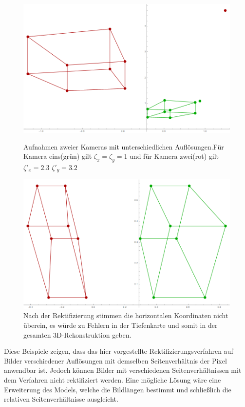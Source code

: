 \begin{figure}[!htb]
	\includegraphics[width=\linewidth]{images/Rectification_Resolution_Abbild_verhaeltnisse.png}
	\caption[Rektifizierung mit $\zeta'_x = 2.3$ und $\zeta'_y = 3.2$]{Aufnahmen zweier Kameras mit unterschiedlichen Auflösungen.Für Kamera eins(grün) gilt \ensuremath{\zeta_x = \zeta_y = 1}  und für Kamera zwei(rot) gilt \ensuremath{\zeta'_x = 2.3} $\zeta'_y= 3.2$}
	\label{fig:7.18}
	\endminipage\hfill
	\includegraphics[width=\linewidth]{images/Rectification_Resolution_verhaeltnisse.png}
	\caption[Rektifizierung mit $\zeta'_x = 2.3$ und $\zeta'_y = 3.2$]{Nach der Rektifizierung stimmen die horizontalen Koordinaten nicht überein, es würde zu Fehlern in der Tiefenkarte und somit in der gesamten 3D-Rekonstruktion geben.}
	\label{fig:7.19}
	\endminipage\hfill
\end{figure}


Diese Beispiele zeigen, dass das hier vorgestellte Rektifizierungsverfahren auf Bilder verschiedener Auflösungen mit demselben Seitenverhältnis der Pixel anwendbar ist. Jedoch können Bilder mit verschiedenen Seitenverhältnissen mit dem Verfahren nicht rektifiziert werden. Eine mögliche Lösung wäre eine Erweiterung des Models, welche die Bildlängen bestimmt und schließlich die relativen Seitenverhältnisse ausgleicht.  


